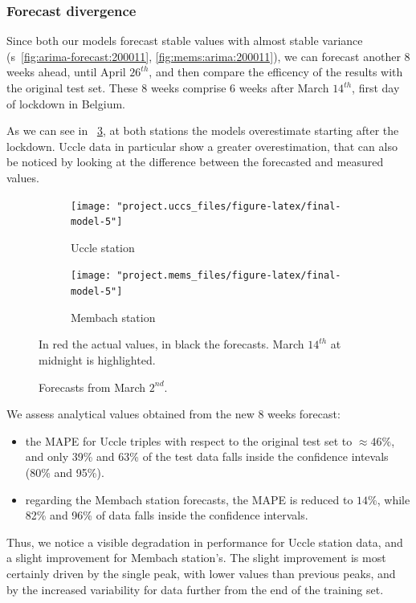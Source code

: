 \documentclass[12pt]{article}
\begin{document}
\subsubsection{Forecast divergence}
Since both our models forecast stable values with almost stable variance (\figurename{s}~\ref{fig:arima-forecast:200011}, \ref{fig:mems:arima:200011}), we can forecast another 8 weeks ahead, until April $26^{th}$, and then compare the efficency of the results with the original test set. These 8 weeks comprise 6 weeks after March $14^{th}$, first day of lockdown in Belgium.

As we can see in \figurename~\ref{fig:forecast.lockdown}, at both stations the models overestimate starting after the lockdown. Uccle data in particular show a greater overestimation, that can also be noticed by looking at the difference between the forecasted and measured values.

\begin{figure}[h]
	\begin{subfigure}{.5\linewidth}
		\texttt{[image: "project.uccs\_files/figure-latex/final-model-5"]}
		\caption{Uccle station}
		\label{fig:forecast.lockdown:uccs}
	\end{subfigure}
	\begin{subfigure}{.5\linewidth}
		\texttt{[image: "project.mems\_files/figure-latex/final-model-5"]}
		\caption{Membach station}
		\label{fig:forecast.lockdown:mems}
	\end{subfigure}
	\caption{Forecasts from March $2^{nd}$.}{\centering\small In red the actual values, in black the forecasts. March $14^{th}$ at midnight is highlighted.\\}
	\label{fig:forecast.lockdown}
\end{figure}
%
We assess analytical values obtained from the new 8 weeks forecast:
\begin{itemize}[topsep=0.5em,itemsep=0em,partopsep=0.5em]
	\item the MAPE for Uccle triples with respect to the original test set to $\approx46\%$, and only 39\% and 63\% of the test data falls inside the confidence intevals (80\% and 95\%).
	\item regarding the Membach station forecasts, the MAPE is reduced to $14\%$, while 82\% and 96\% of data falls inside the confidence intervals.
\end{itemize}

Thus, we notice a visible degradation in performance for Uccle station data, and a slight improvement for Membach station's. The slight improvement is most certainly driven by the single peak, with lower values than previous peaks, and by the increased variability for data further from the end of the training set.
\end{document}
